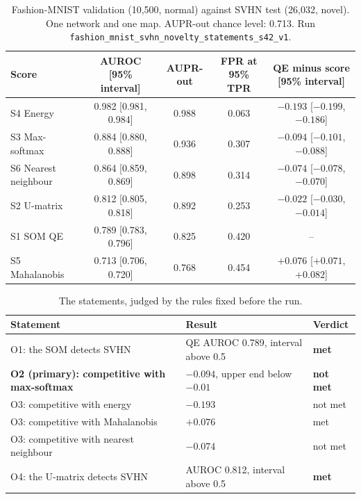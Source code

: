 \documentclass[11pt]{article}
\begin{document}
\begin{table}[H]
\centering\footnotesize\setlength{\tabcolsep}{4pt}
\begin{tabular}{@{}lcccc@{}}\toprule
Score & AUROC [95\% interval] & AUPR-out & FPR at 95\% TPR & QE minus score [95\% interval]\\\midrule
S4 Energy & 0.982 [0.981, 0.984] & 0.988 & 0.063 & $-0.193$ [$-0.199$, $-0.186$]\\
S3 Max-softmax & 0.884 [0.880, 0.888] & 0.936 & 0.307 & $-0.094$ [$-0.101$, $-0.088$]\\
S6 Nearest neighbour & 0.864 [0.859, 0.869] & 0.898 & 0.314 & $-0.074$ [$-0.078$, $-0.070$]\\
S2 U-matrix & 0.812 [0.805, 0.818] & 0.892 & 0.253 & $-0.022$ [$-0.030$, $-0.014$]\\
S1 SOM QE & 0.789 [0.783, 0.796] & 0.825 & 0.420 & --\\
S5 Mahalanobis & 0.713 [0.706, 0.720] & 0.768 & 0.454 & $+0.076$ [$+0.071$, $+0.082$]\\\bottomrule
\end{tabular}
\caption{Fashion-MNIST validation (10,500, normal) against SVHN test (26,032, novel). One network and one map. AUPR-out chance level: 0.713. Run \texttt{fashion\_mnist\_svhn\_novelty\_statements\_s42\_v1}.}
\label{tab:far}
\end{table}

\begin{table}[H]
\centering\small
\begin{tabular}{@{}lll@{}}\toprule
Statement & Result & Verdict\\\midrule
O1: the SOM detects SVHN & QE AUROC 0.789, interval above 0.5 & \textbf{met}\\
\textbf{O2 (primary): competitive with max-softmax} & $-0.094$, upper end below $-0.01$ & \textbf{not met}\\
O3: competitive with energy & $-0.193$ & not met\\
O3: competitive with Mahalanobis & $+0.076$ & met\\
O3: competitive with nearest neighbour & $-0.074$ & not met\\
O4: the U-matrix detects SVHN & AUROC 0.812, interval above 0.5 & \textbf{met}\\\bottomrule
\end{tabular}
\caption{The statements, judged by the rules fixed before the run.}
\label{tab:statements}
\end{table}
\end{document}
